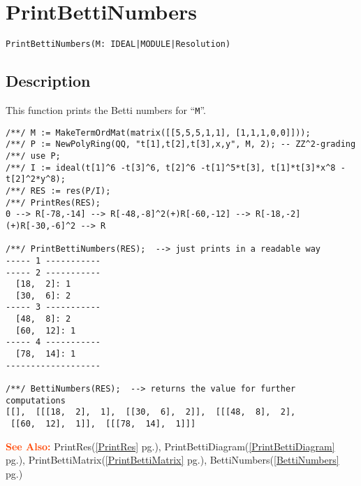 \documentclass[a4paper]{mybook}
\newenvironment{command}{}{} %
\newcommand\SeeAlso{\par\textcolor{OrangeRed}{\textbf{\large See Also: }}}
\begin{document}
\section{PrintBettiNumbers}
\label{PrintBettiNumbers}
\begin{command} %


\begin{Verbatim}[label=syntax, rulecolor=\color{MidnightBlue},
frame=single]
PrintBettiNumbers(M: IDEAL|MODULE|Resolution)
\end{Verbatim}


\subsection*{Description}

This function prints the Betti numbers for ``\verb&M&''.
\begin{Verbatim}[label=example, rulecolor=\color{PineGreen}, frame=single]
/**/ M := MakeTermOrdMat(matrix([[5,5,5,1,1], [1,1,1,0,0]]));
/**/ P := NewPolyRing(QQ, "t[1],t[2],t[3],x,y", M, 2); -- ZZ^2-grading
/**/ use P;
/**/ I := ideal(t[1]^6 -t[3]^6, t[2]^6 -t[1]^5*t[3], t[1]*t[3]*x^8 -t[2]^2*y^8);
/**/ RES := res(P/I);
/**/ PrintRes(RES);
0 --> R[-78,-14] --> R[-48,-8]^2(+)R[-60,-12] --> R[-18,-2](+)R[-30,-6]^2 --> R

/**/ PrintBettiNumbers(RES);  --> just prints in a readable way
----- 1 -----------
----- 2 -----------
  [18,  2]: 1
  [30,  6]: 2
----- 3 -----------
  [48,  8]: 2
  [60,  12]: 1
----- 4 -----------
  [78,  14]: 1
-------------------

/**/ BettiNumbers(RES);  --> returns the value for further computations
[[],  [[[18,  2],  1],  [[30,  6],  2]],  [[[48,  8],  2],
 [[60,  12],  1]],  [[[78,  14],  1]]]
\end{Verbatim}


\SeeAlso %
  PrintRes(\ref{PrintRes} pg.\pageref{PrintRes}), 
    PrintBettiDiagram(\ref{PrintBettiDiagram} pg.\pageref{PrintBettiDiagram}), 
    PrintBettiMatrix(\ref{PrintBettiMatrix} pg.\pageref{PrintBettiMatrix}), 
    BettiNumbers(\ref{BettiNumbers} pg.\pageref{BettiNumbers})
\end{command} %
\end{document}
